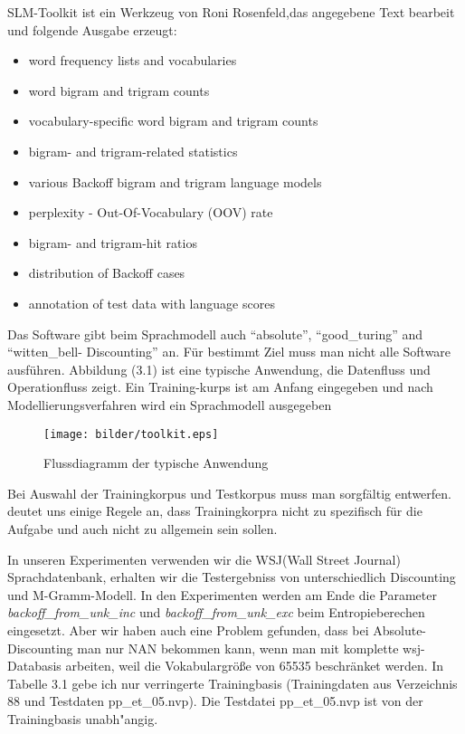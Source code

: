 SLM-Toolkit ist ein Werkzeug von Roni Rosenfeld,das angegebene Text bearbeit und folgende Ausgabe erzeugt\cite{int_slm_toolkit}:
\begin{itemize}
	\item word frequency lists and vocabularies
	\item word bigram and trigram counts
	\item vocabulary-specific word bigram and trigram counts
	\item bigram- and trigram-related statistics
	\item various Backoff bigram and trigram language models
	\item perplexity - Out-Of-Vocabulary (OOV) rate 
	\item bigram- and trigram-hit ratios
	\item distribution of Backoff cases 
	\item annotation of test data with language scores 
\end{itemize}

Das Software gibt beim Sprachmodell auch "`absolute"', "`good\_turing"' and "`witten\_bell- Discounting"' an.
F\"ur bestimmt Ziel muss man nicht alle Software ausf\"uhren. Abbildung (3.1) ist eine typische Anwendung, die Datenfluss und Operationfluss zeigt.
Ein Training-kurps ist am Anfang eingegeben und nach Modellierungsverfahren wird ein Sprachmodell ausgegeben


\begin{figure}[h]
	\texttt{[image: bilder/toolkit.eps]}
	 \caption{Flussdiagramm der typische Anwendung}
  \label{fig:figure_2}
\end{figure}

Bei Auswahl der Trainingkorpus und Testkorpus muss man sorgf\"altig entwerfen. \cite{book_speech} deutet uns einige Regele an, dass Trainingkorpra nicht zu spezifisch f\"ur die Aufgabe und auch nicht zu allgemein sein sollen.  

In unseren Experimenten verwenden wir die WSJ(Wall Street Journal) Sprachdatenbank, erhalten wir die Testergebniss von unterschiedlich Discounting und M-Gramm-Modell. In den Experimenten werden am Ende die Parameter \emph{backoff\_from\_unk\_inc} und \emph{backoff\_from\_unk\_exc} beim Entropieberechen eingesetzt.  
 Aber wir haben auch eine Problem gefunden, dass bei Absolute-Discounting man nur NAN bekommen kann, wenn man mit komplette wsj-Databasis arbeiten, weil die Vokabulargr\"o\ss e von 65535 beschr\"anket werden. In Tabelle 3.1 gebe ich nur verringerte Trainingbasis (Trainingdaten aus Verzeichnis 88 und Testdaten pp\_et\_05.nvp). Die Testdatei pp\_et\_05.nvp ist von der Trainingbasis unabh"angig.
 
